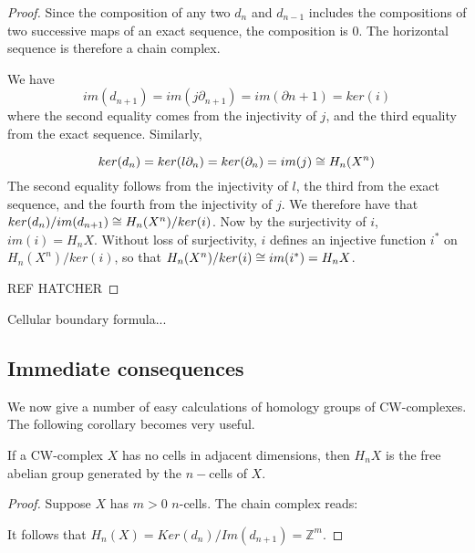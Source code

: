 \begin{definitions}
\begin{proof}
Since the composition of any two $d_n$ and $d_{n-1}$ includes the compositions of two successive maps of an exact sequence, the composition is $0$. The horizontal sequence is therefore a chain complex.

We have $$im(d_{n+1})=im(j \partial_{n+1})=im(\partial{n+1})=ker(i)$$
where the second equality comes from the injectivity of $j$, and the third equality from the exact sequence. Similarly,

$$ker(d_n)=ker(l \partial_n)=ker(\partial_n)=im(j)\cong H_n(X^n)$$
The second equality follows from the injectivity of $l$, the third from the exact sequence, and the fourth from the injectivity of $j$. We therefore have that 
$ker(d_n)/im(d_{n+1})\cong H_n(X^n)/ker(i)$. Now by the surjectivity of $i$, $im(i)=H_n X$. Without loss of surjectivity, $i$ defines an injective function $i^*$ on $H_n(X^n)/ker(i)$, so that $H_n(X^n)/ker(i)\cong im(i^*)=H_n X$.

REF HATCHER
\end{proof}

Cellular boundary formula...
\begin{theorem}\label{boundary-formula}
\end{theorem}

\subsection{Immediate consequences}
We now give a number of easy calculations of homology groups of CW-complexes. The following corollary becomes very useful.

\begin{corollary}\label{cell-adjacent} If a CW-complex $X$ has no cells in adjacent dimensions, then $H_n X$ is the free abelian group generated by the $n-$cells of $X$.
\end{corollary}
\begin{proof}
Suppose $X$ has $m>0$ $n$-cells. The chain complex reads:


It follows that $H_n(X)=Ker(d_n)/Im(d_{n+1})=\mathbb{Z}^m$.
\end{proof}


\end{definitions}
